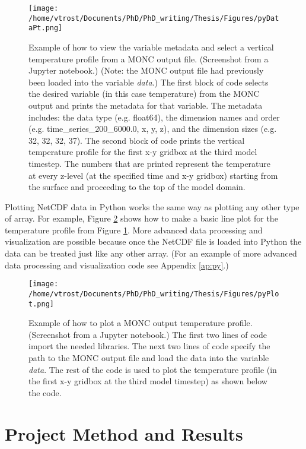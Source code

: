 \begin{figure}[h]
	\centering
	\texttt{[image: /home/vtrost/Documents/PhD/PhD\_writing/Thesis/Figures/pyDataPt.png]}
	\caption{Example of how to view the variable metadata and select a vertical temperature profile from a MONC output file. (Screenshot from a Jupyter notebook.) (Note: the MONC output file had previously been loaded into the variable \textit{data}.) The first block of code selects the desired variable (in this case temperature) from the MONC output and prints the metadata for that variable. The metadata includes: the data type (e.g. float64), the dimension names and order (e.g. time\_series\_200\_6000.0, x, y, z), and the dimension sizes (e.g. 32, 32, 32, 37). The second block of code prints the vertical temperature profile for the first x-y gridbox at the third model timestep. The numbers that are printed represent the temperature at every z-level (at the specified time and x-y gridbox) starting from the surface and proceeding to the top of the model domain.}
	\label{fig:pyDataPt}
\end{figure}

Plotting NetCDF data in Python works the same way as plotting any other type of array. For example, Figure \ref{fig:pyPlot} shows how to make a basic line plot for the temperature profile from Figure \ref{fig:pyDataPt}. More advanced data processing and visualization are possible because once the NetCDF file is loaded into Python the data can be treated just like any other array. (For an example of more advanced data processing and visualization code see Appendix \ref{ap:py}.)

\begin{figure}[h]
	\centering
	\texttt{[image: /home/vtrost/Documents/PhD/PhD\_writing/Thesis/Figures/pyPlot.png]}
	\caption{Example of how to plot a MONC output temperature profile. (Screenshot from a Jupyter notebook.) The first two lines of code import the needed libraries. The next two lines of code specify the path to the MONC output file and load the data into the variable \textit{data}. The rest of the code is used to plot the temperature profile (in the first x-y gridbox at the third model timestep) as shown below the code.}
	\label{fig:pyPlot}
\end{figure}

\chapter{Project Method and Results}
